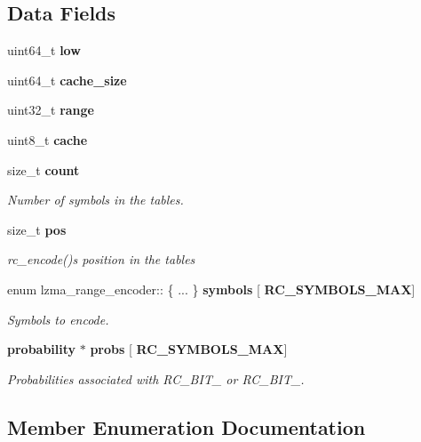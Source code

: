 \subsection*{Data Fields}
\begin{DoxyCompactItemize}
\item 
\mbox{\label{structlzma__range__encoder_aea514237688256472a39826ec6a39bec}} 
uint64\+\_\+t {\bfseries low}
\item 
\mbox{\label{structlzma__range__encoder_a2e3ea76f8de7eae04ef9f217458e2e16}} 
uint64\+\_\+t {\bfseries cache\+\_\+size}
\item 
\mbox{\label{structlzma__range__encoder_aeb5047cba8d9006ed10e5dd3700351c4}} 
uint32\+\_\+t {\bfseries range}
\item 
\mbox{\label{structlzma__range__encoder_ac4ef8e2923b343ded1c3a1a829fc5260}} 
uint8\+\_\+t {\bfseries cache}
\item 
size\+\_\+t \textbf{ count}
\begin{DoxyCompactList}\small\item\em Number of symbols in the tables. \end{DoxyCompactList}\item 
size\+\_\+t \textbf{ pos}
\begin{DoxyCompactList}\small\item\em rc\+\_\+encode()\textquotesingle{}s position in the tables \end{DoxyCompactList}\item 
enum lzma\+\_\+range\+\_\+encoder\+:: \{ ... \}  \textbf{ symbols} [\textbf{ R\+C\+\_\+\+S\+Y\+M\+B\+O\+L\+S\+\_\+\+M\+AX}]
\begin{DoxyCompactList}\small\item\em Symbols to encode. \end{DoxyCompactList}\item 
\textbf{ probability} $\ast$ \textbf{ probs} [\textbf{ R\+C\+\_\+\+S\+Y\+M\+B\+O\+L\+S\+\_\+\+M\+AX}]
\begin{DoxyCompactList}\small\item\em Probabilities associated with R\+C\+\_\+\+B\+I\+T\+\_ or R\+C\+\_\+\+B\+I\+T\+\_. \end{DoxyCompactList}\end{DoxyCompactItemize}


\subsection{Member Enumeration Documentation}
\mbox{\label{structlzma__range__encoder_aa9d96d491ead90fb4b58bb71aa36c0a7}} 
